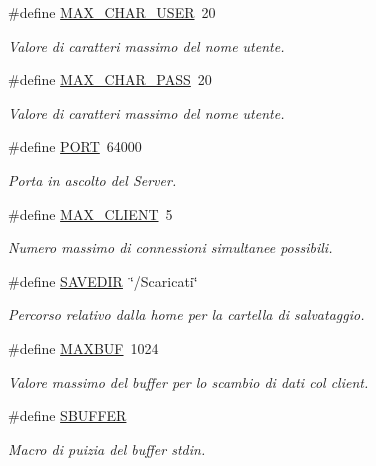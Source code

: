 \begin{DoxyCompactItemize}
\#define \mbox{\hyperlink{a00050_a18e9e79b7a0fd224d66258d08f939cc4}{M\+A\+X\+\_\+\+C\+H\+A\+R\+\_\+\+U\+S\+ER}}~20
\begin{DoxyCompactList}\small\item\em Valore di caratteri massimo del nome utente. \end{DoxyCompactList}\item 
\#define \mbox{\hyperlink{a00050_ae15aadb253d64179b684ad4dad2ec39c}{M\+A\+X\+\_\+\+C\+H\+A\+R\+\_\+\+P\+A\+SS}}~20
\begin{DoxyCompactList}\small\item\em Valore di caratteri massimo del nome utente. \end{DoxyCompactList}\item 
\#define \mbox{\hyperlink{a00050_a614217d263be1fb1a5f76e2ff7be19a2}{P\+O\+RT}}~64000
\begin{DoxyCompactList}\small\item\em Porta in ascolto del Server. \end{DoxyCompactList}\item 
\#define \mbox{\hyperlink{a00050_ab8ba2d8f79af5ca38005742bbc29a927}{M\+A\+X\+\_\+\+C\+L\+I\+E\+NT}}~5
\begin{DoxyCompactList}\small\item\em Numero massimo di connessioni simultanee possibili. \end{DoxyCompactList}\item 
\#define \mbox{\hyperlink{a00050_a622fe76a51e7e65de314a526dcbd535e}{S\+A\+V\+E\+D\+IR}}~\char`\"{}/Scaricati\char`\"{}
\begin{DoxyCompactList}\small\item\em Percorso relativo dalla home per la cartella di salvataggio. \end{DoxyCompactList}\item 
\#define \mbox{\hyperlink{a00050_ad7871643c05865c80f5d8050aead2b57}{M\+A\+X\+B\+UF}}~1024
\begin{DoxyCompactList}\small\item\em Valore massimo del buffer per lo scambio di dati col client. \end{DoxyCompactList}\item 
\#define \mbox{\hyperlink{a00050_a7fa81987956645a88559576f6be2f51d}{S\+B\+U\+F\+F\+ER}}
\begin{DoxyCompactList}\small\item\em Macro di puizia del buffer stdin. \end{DoxyCompactList}\item 

\end{DoxyCompactItemize}
